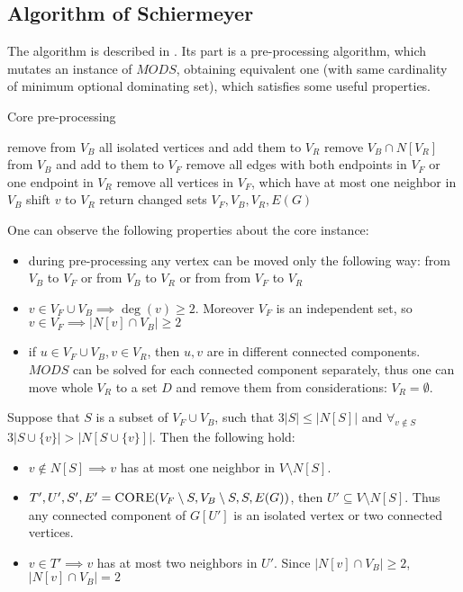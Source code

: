 \subsection{Algorithm of Schiermeyer}
The algorithm is described in \cite{SCHIERMEYER20083291}. Its part is a pre-processing algorithm, which mutates an instance of $MODS$, obtaining equivalent one (with same cardinality of minimum optional dominating set), which satisfies some useful properties.
\begin{algorithm}
\caption{Core pre-processing}
\label{alg:core}
\begin{algorithmic}[1]
 
\Do
\State remove from $V_B$ all isolated vertices and add them to $V_R$
\State remove $V_B \cap N[V_R]$ from $V_B$ and add to them to $V_F$
\State remove all edges with both endpoints in $V_F$ or one endpoint in $V_R$
\State remove all vertices in $V_F$, which have at most one neighbor in $V_B$
 shift $v$ to $V_R$
\EndWhile
{}
\State return changed sets $V_F, V_B, V_R, E(G)$
\EndProcedure
\end{algorithmic}
\end{algorithm}

One can observe the following properties about the core instance:
\begin{itemize}
    \item during pre-processing any vertex can be moved only the following way: from $V_B$ to $V_F$ or from $V_B$ to $V_R$ or from from $V_F$ to $V_R$
    \item $v \in V_F \cup V_B \implies \deg(v) \geq 2$. Moreover $V_F$ is an independent set, so $v\in V_F \implies |N[v] \cap V_B| \geq 2$ 
    \item if $u \in V_F \cup V_B, v\in V_R$, then $u,v$ are in different connected components. $MODS$ can be solved for each connected component separately, thus one can move whole $V_R$ to a set $D$ and remove them from considerations: $V_R = \emptyset$.
\end{itemize}
Suppose that $S$ is a subset of $V_F \cup V_B$, such that $3|S| \leq |N[S]|$ and $\forall_{v\notin S}$ $3|S \cup \{v\}| > |N[S \cup \{v\}]|$. Then the following hold:
\begin{itemize}
    \item $v \notin N[S] \implies v$ has at most one neighbor in $V \setminus N[S]$.
    \item $T', U', S', E' = \textsc{CORE}(V_F \setminus S, V_B\setminus S, S, E(G))$, then $U' \subseteq V \setminus N[S]$. Thus any connected component of $G[U']$ is an isolated vertex or two connected vertices.
    \item $v \in T' \implies v$ has at most two neighbors in $U'$. Since $|N[v] \cap V_B| \geq 2$, $|N[v] \cap V_B| = 2$
\end{itemize}

